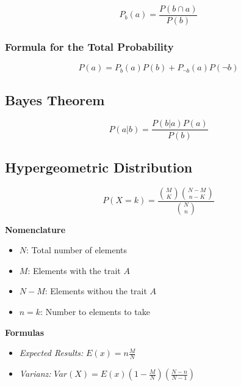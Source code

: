 \[P_b (a) = \frac{P(b \cap a)}{P(b)}\]

\subsubsection{Formula for the Total Probability}

\[P(a) = P_b (a) P(b) + P_{\neg b}(a) P(\neg b)\]

\subsection{Bayes Theorem}

\[P(a | b) = \frac{P(b | a) P(a)}{P(b)}\]

\subsection{Hypergeometric Distribution}

\[P(X = k) = \frac{\binom{M}{K} \binom{N - M}{n - K}}{\binom{N}{n}}\]

\textbf{Nomenclature}
\begin{itemize}[label=\(-\)]
    \item \(N\): Total number of elements
    \item \(M\): Elements with the trait \(A\)
    \item \(N - M\): Elements withou the trait \(A\)
    \item \(n = k\): Number to elements to take
\end{itemize}

\textbf{Formulas }
\begin{itemize}[label=\(-\)]
    \item \emph{Expected Results: } \(E(x) = n \frac{M}{N}\)
    \item \emph{Varianz: } \(Var(X) = E(x)\left(1 - \frac{M}{N}\right) \left(\frac{N - n}{N - 1}\right)\)
\end{itemize}

\newpage
